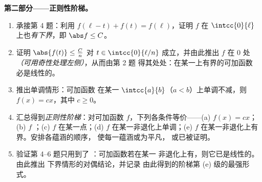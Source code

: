 \begin{problem}[{周末问题——$f(x + y) = f(x) + f(y)$：
正则性导出线性，以及“怪物”的画像}]
\medskip
\noindent\textbf{第二部分——正则性阶梯。}
\begin{enumerate}[resume]
  \item 承接第 4 题：利用 $f(\ell - t) + f(t) =
        f(\ell)$，证明 $f$ 在
        $\intcc{0}{\ell}$ 上也\emph{有下界}，即 $\abs f \leq C$。
  \item 证明 $\abs{f(t)} \leq \frac{C}{n}$ 对 $t \in
        \intcc{0}{\ell/n}$ 成立，并由此推出 $f$ 在
        $0$ 处\emph{（可用奇性处理左侧）}，从而由第 2 题
        得其处处：在某一上有界的可加函数
        必是线性的。
  \item 推出单调情形：可加函数
        在某一 $\intcc{a}{b}$（$a < b$）上单调不减，则 $f(x)
        = cx$，其中 $c \geq 0$。
  \item 汇总得到\emph{正则性阶梯}：对可加函数
        $f$，下列各条件等价——(a) $f(x) = cx$；
        (b) $f$ ；(c) $f$ 在某一点；(d)
        $f$ 在某一非退化上单调；(e) $f$
        在某一非退化上有界。安排各蕴涵的顺序，
        使每一蕴涵或为平凡，
        或已被证明。
  \item 验证第 4--6 题只用到了
        \emph{}：可加函数若在某一
        非退化上有，则它已是线性的。由此推出
        下界情形的对偶结论，并记录
        由此得到的阶梯第 (e) 级的最强形式。
\end{enumerate}


\end{problem}
